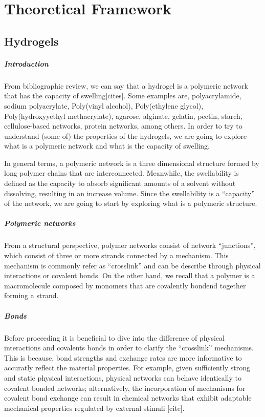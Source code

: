 \chapter{Theoretical Framework}\label{ch1:Intro}

\section{Hydrogels}

\paragraph{Introduction} From bibliographic review, we can say that a hydrogel is a polymeric network that has the capacity of swelling[cites].
Some examples are,
    polyacrylamide,
    sodium polyacrylate,
    Poly(vinyl alcohol),
    Poly(ethylene glycol),
    Poly(hydroxyyethyl methacrylate),
    agarose,
    alginate,
    gelatin,
    pectin,
    starch,
    cellulose-based networks,
    protein networks,
    among others.
In order to try to understand (some of) the properties of the hydrogels, we are going to explore what is a polymeric network and what is the capacity of swelling.

In general terms, a polymeric network is a three dimensional structure formed by long polymer chains that are interconnected.
Meanwhile, the swellability is defined as the capacity to absorb significant amounts of a solvent without dissolving, resulting in an increase volume.
Since the swellability is a ``capacity'' of the network, we are going to start by exploring what is a polymeric structure.

\paragraph{Polymeric networks} From a structural perspective, polymer networks consist of network ``junctions'', which consist of three or more strands connected by a mechanism. 
This mechanism is commonly refer as ``crosslink'' and can be describe through physical interactions or covalent bonds.
On the other hand, we recall that a polymer is a macromolecule composed by monomers that are covalently bondend together forming a strand.

\paragraph{Bonds} Before proceeding it is beneficial to dive into the difference of physical interactions and covalents bonds in order to clarify the ``crosslink'' mechanisms.
This is because, bond strengths and exchange rates are more informative to accuratly reflect the material properties.
For example, given sufficiently strong and static physical interactions, physical networks can behave identically to covalent bonded networks; 
alternatively, the incorporation of mechanisms for covalent bond exchange can result in chemical networks that exhibit adaptable mechanical properties regulated by external stimuli [cite]. 

